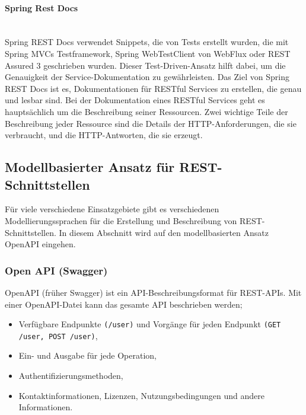 \paragraph{Spring Rest Docs}\mbox{}\\

Spring REST Docs verwendet Snippets, die von Tests erstellt wurden, die mit Spring MVCs Testframework, Spring WebTestClient von WebFlux oder REST Assured 3 geschrieben wurden. Dieser Test-Driven-Ansatz hilft dabei, um die Genauigkeit der Service-Dokumentation zu gewährleisten. Das Ziel von Spring REST Docs ist es, Dokumentationen für RESTful Services zu erstellen, die genau und lesbar sind. Bei der Dokumentation eines RESTful Services geht es hauptsächlich um die Beschreibung seiner Ressourcen. Zwei wichtige Teile der Beschreibung jeder Ressource sind die Details der HTTP-Anforderungen, die sie verbraucht, und die HTTP-Antworten, die sie erzeugt\cite{srd18wilkinson}.

\subsection{Modellbasierter Ansatz für REST-Schnittstellen}

Für viele verschiedene Einsatzgebiete gibt es verschiedenen Modellierungssprachen für die Erstellung und Beschreibung von REST-Schnittstellen. In diesem Abschnitt wird auf den modellbasierten Ansatz OpenAPI eingehen.

\subsubsection{Open API (Swagger)}

OpenAPI (früher Swagger) ist ein API-Beschreibungsformat für REST-APIs. Mit einer OpenAPI-Datei kann das gesamte API beschrieben werden\cite{openapi13def};

\begin{itemize}
	
	\item Verfügbare Endpunkte \texttt{(/user)} und Vorgänge für jeden Endpunkt \texttt{(GET /user, POST /user)},
	
	\item Ein- und Ausgabe für jede Operation,
	
	\item Authentifizierungsmethoden,
	
	\item Kontaktinformationen, Lizenzen, Nutzungsbedingungen und andere Informationen.
	
\end{itemize}

